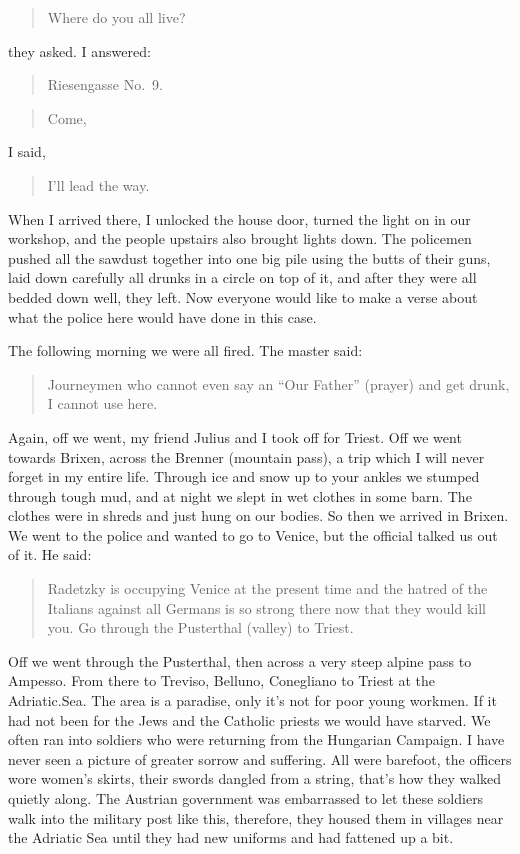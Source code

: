 \documentclass{article}
\begin{document}
\begin{quote}
Where do you all live?
\end{quote}

they asked. I answered:

\begin{quote}
Riesengasse No.~9.
\end{quote}

\begin{quote}
Come,
\end{quote}

I said,

\begin{quote}
I'll lead the way.
\end{quote}

When I arrived there, I unlocked the house door, turned the light on in our workshop, and the people upstairs also brought lights down. The policemen pushed all the sawdust together into one big pile using the butts of their guns, laid down carefully all drunks in a circle on top of it, and after they were all bedded down well, they left. Now everyone would like to make a verse about what the police here would have done in this case.

The following morning we were all fired. The master said:

\begin{quote}
Journeymen who cannot even say an ``Our Father'' (prayer) and get drunk, I cannot use here.
\end{quote}

Again, off we went, my friend Julius and I took off for Triest. Off we went towards Brixen, across the Brenner (mountain pass), a trip which I will never forget in my entire life. Through ice and snow up to your ankles we stumped through tough mud, and at night we slept in wet clothes in some barn. The clothes were in shreds and just hung on our bodies. So then we arrived in Brixen. We went to the police and wanted to go to Venice, but the official talked us out of it. He said:

\begin{quote}
Radetzky is occupying Venice at the present time and the hatred of the Italians against all Germans is so strong there now that they would kill you. Go through the Pusterthal (valley) to Triest.
\end{quote}

Off we went through the Pusterthal, then across a very steep alpine pass to Ampesso. From there to Treviso, Belluno, Conegliano to Triest at the Adriatic.Sea. The area is a paradise, only it's not for poor young workmen. If it had not been for the Jews and the Catholic priests we would have starved. We often ran into soldiers who were returning from the Hungarian Campaign. I have never seen a picture of greater sorrow and suffering. All were barefoot, the officers wore women's skirts, their swords dangled from a string, that's how they walked quietly along. The Austrian government was embarrassed to let these soldiers walk into the military post like this, therefore, they housed them in villages near the Adriatic Sea until they had new uniforms and had fattened up a bit.
\end{document}
